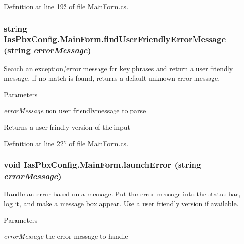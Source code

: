 Definition at line 192 of file MainForm.cs.\hypertarget{class_ias_pbx_config_1_1_main_form_a45c777ea67451ec8a3619cd5510522ca}{
\subsubsection[{findUserFriendlyErrorMessage}]{\setlength{\rightskip}{0pt plus 5cm}string IasPbxConfig.MainForm.findUserFriendlyErrorMessage (string {\em errorMessage})}}
\label{class_ias_pbx_config_1_1_main_form_a45c777ea67451ec8a3619cd5510522ca}


Search an exception/error message for key phrases and return a user friendly message. If no match is found, returns a default unknown error message. 
\begin{DoxyParams}{Parameters}
\item[{\em errorMessage}]non user friendlymessage to parse \end{DoxyParams}
\begin{DoxyReturn}{Returns}
a user frindly version of the input 
\end{DoxyReturn}


Definition at line 227 of file MainForm.cs.\hypertarget{class_ias_pbx_config_1_1_main_form_a68cad20fefea28e92a5e51e25bffa2e1}{
\subsubsection[{launchError}]{\setlength{\rightskip}{0pt plus 5cm}void IasPbxConfig.MainForm.launchError (string {\em errorMessage})}}
\label{class_ias_pbx_config_1_1_main_form_a68cad20fefea28e92a5e51e25bffa2e1}


Handle an error based on a message. Put the error message into the status bar, log it, and make a message box appear. Use a user friendly version if available. 
\begin{DoxyParams}{Parameters}
\item[{\em errorMessage}]the error message to handle \end{DoxyParams}


